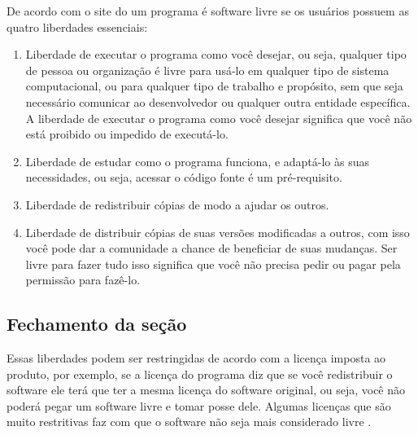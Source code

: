 De acordo com o site do \cite{gnu} um programa é software livre se os usuários possuem as quatro liberdades essenciais:

\begin{enumerate}
  \item Liberdade de executar o programa como você desejar, ou seja, qualquer tipo de pessoa ou organização é livre para usá-lo em qualquer tipo de sistema computacional, ou para qualquer tipo de trabalho e propósito, sem que seja necessário comunicar ao desenvolvedor ou qualquer outra entidade específica. A liberdade de executar o programa como você desejar significa que você não está proibido ou impedido de executá-lo.
  \item Liberdade de estudar como o programa funciona, e adaptá-lo às suas necessidades, ou seja, acessar o código fonte é um pré-requisito.
  \item Liberdade de redistribuir cópias de modo a ajudar os outros.
  \item Liberdade de distribuir cópias de suas versões modificadas a outros, com isso você pode dar a comunidade a chance de beneficiar de suas mudanças. Ser livre para fazer tudo isso significa que você não precisa pedir ou pagar pela permissão para fazê-lo.
\end{enumerate}

\subsection{Fechamento da seção}

Essas liberdades podem ser restringidas de acordo com a licença imposta ao produto, por exemplo, se a licença do
programa diz que se você redistribuir o software ele terá que ter a mesma licença do software original, ou seja, você
não poderá pegar um software livre e tomar posse dele. Algumas licenças que são muito restritivas faz com que o software
não seja mais considerado livre \cite{gnu}.
